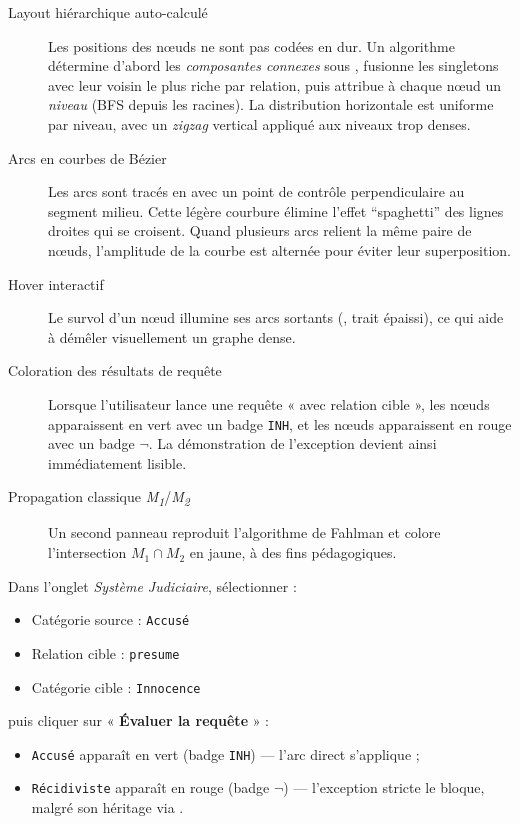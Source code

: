 \begin{description}
  \item[Layout hiérarchique auto-calculé] Les positions des nœuds ne sont pas
        codées en dur. Un algorithme détermine d'abord les
        \emph{composantes connexes} sous , fusionne les singletons
        avec leur voisin le plus riche par relation, puis attribue à chaque
        nœud un \emph{niveau} (BFS depuis les racines). La distribution
        horizontale est uniforme par niveau, avec un \emph{zigzag} vertical
        appliqué aux niveaux trop denses.

  \item[Arcs en courbes de Bézier] Les arcs sont tracés en
         avec un point de contrôle perpendiculaire au
        segment milieu. Cette légère courbure élimine l'effet ``spaghetti''
        des lignes droites qui se croisent. Quand plusieurs arcs relient la
        même paire de nœuds, l'amplitude de la courbe est alternée pour éviter
        leur superposition.

  \item[Hover interactif] Le survol d'un nœud illumine ses arcs sortants
        (, trait épaissi), ce qui aide à démêler
        visuellement un graphe dense.

  \item[Coloration des résultats de requête] Lorsque l'utilisateur lance une
        requête « avec relation cible », les nœuds  apparaissent
        en vert avec un badge \texttt{INH}, et les nœuds 
        apparaissent en rouge avec un badge $\lnot$. La démonstration de
        l'exception devient ainsi immédiatement lisible.

  \item[Propagation classique \emph{M\textsubscript{1}}/\emph{M\textsubscript{2}}]
        Un second panneau reproduit l'algorithme de Fahlman et colore
        l'intersection $M_1 \cap M_2$ en jaune, à des fins pédagogiques.
\end{description}

\begin{tcolorbox}[resultbox, title={Démo de l'exception en direct}]
Dans l'onglet \emph{Système Judiciaire}, sélectionner :
\begin{itemize}
  \item Catégorie source : \texttt{Accusé}
  \item Relation cible : \texttt{presume}
  \item Catégorie cible : \texttt{Innocence}
\end{itemize}
puis cliquer sur « \textbf{Évaluer la requête} » :
\begin{itemize}
  \item \texttt{Accusé} apparaît en vert (badge \texttt{INH}) — l'arc direct
         s'applique ;
  \item \texttt{Récidiviste} apparaît en rouge (badge $\lnot$) — l'exception
        stricte le bloque, malgré son héritage via .
\end{itemize}
\end{tcolorbox}

